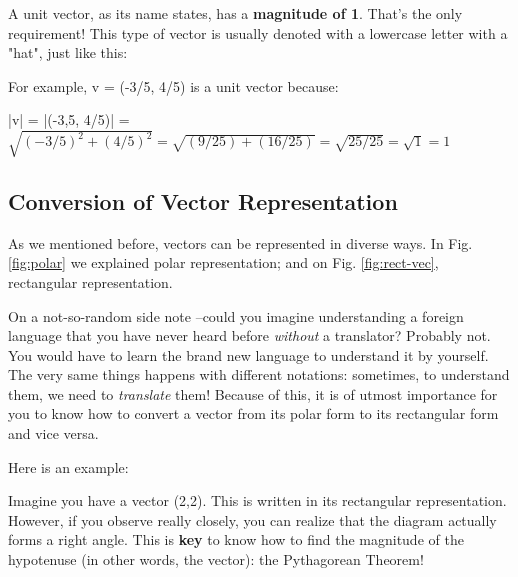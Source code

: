 A unit vector, as its name states, has a \textbf{magnitude of 1}. That's the only requirement! This type of vector is usually denoted with a lowercase letter with a "hat", just like this:

For example, v = (-3/5, 4/5) is a unit vector because: 

|v| = |(-3,5, 4/5)| = $\sqrt{(-3/5)^2 + (4/5)^2} = \sqrt{(9/25) + (16/25)} = \sqrt{25/25} = \sqrt{1} = 1$

{
\begin{center}
\end{center}
}

\subsection{Conversion of Vector Representation}
As we mentioned before, vectors can be represented in diverse ways. In Fig. \ref{fig:polar} we explained polar representation; and on Fig. \ref{fig:rect-vec}, rectangular representation. 

On a not-so-random side note --could you imagine understanding a foreign language that you have never heard before \textit{without} a translator? Probably not. You would have to learn the brand new language to understand it by yourself. The very same things happens with different notations: sometimes, to understand them, we need to \textit{translate} them! Because of this, it is of utmost importance for you to know how to convert a vector from its polar form to its rectangular form and vice versa.

Here is an example: 

Imagine you have a vector (2,2). This is written in its rectangular representation. However, if you observe really closely, you can realize that the diagram actually forms a right angle. This is \textbf{key} to know how to find the magnitude of the hypotenuse (in other words, the vector): the Pythagorean Theorem!

{
\begin{center}
\end{center}
}

